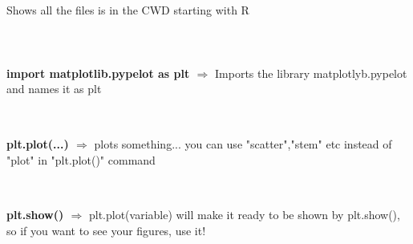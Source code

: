 \documentclass[a4paper,18pt]{article}
\begin{document}

\subsection{\colorbox {matgreen}{\color{white}{\large glob.glob('R*')}}}
Shows all the files is in the CWD starting with R\\\\

\section{\colorbox {Abi}{}}

\subsection{\colorbox {matgreen}{\color{white}{\large import matplotlib.pypelot as plt}}}
\textbf{import matplotlib.pypelot as plt $\Rightarrow$} Imports the library matplotlyb.pypelot and names it as plt\\\\


\subsection{\colorbox {matgreen}{\color{white}{\large plt.plot(...)}}}
\textbf{plt.plot(...) $\Rightarrow$} plots something... you can use "scatter","stem" etc instead of "plot" in "plt.plot()" command\\\\


\subsection{\colorbox {matgreen}{\color{white}{\large plt.show()}}}
\textbf{plt.show() $\Rightarrow$} plt.plot(variable) will make it ready to be shown by plt.show(), so if you want to see your figures, use it!\\\\
\end{document}
